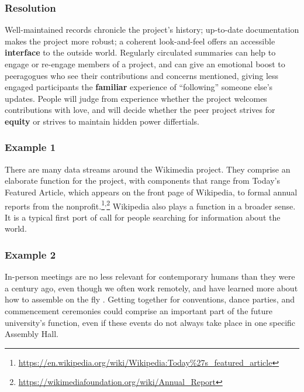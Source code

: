 \subsubsection*{Resolution} 
Well-maintained records chronicle the project's history; up-to-date documentation makes the project more robust; a coherent look-and-feel offers an accessible \textbf{interface} to the outside world.  Regularly circulated summaries can help to engage or re-engage members of a project, and can give an emotional boost to peeragogues who see their contributions and concerns mentioned, giving less engaged participants the \textbf{familiar} experience of ``following'' someone else's updates. People will judge from experience whether the project welcomes contributions with love, and will decide whether the peer project strives for \textbf{equity} or strives to maintain hidden power differtials.  

\subsubsection*{Example 1} 
There are many data streams around the Wikimedia project.  They comprise
an elaborate  function for the project, with components
that range from Today's Featured Article, which appears on the front page of
Wikipedia, to formal annual reports from the  nonprofit.\footnote{\url{https://en.wikipedia.org/wiki/Wikipedia:Today\%27s_featured_article}}\textsuperscript{,}\footnote{\url{https://wikimediafoundation.org/wiki/Annual_Report}}
Wikipedia also plays a  function in a broader sense.
It is a typical first port of call for people searching for information about the world.

\subsubsection*{Example 2} In-person meetings are no less relevant
for contemporary humans than they were a century ago, even though we
often work remotely, and have learned more about how to assemble on the fly
\cite{rheingold2007smart}.  Getting together for conventions, dance
parties, and commencement ceremonies could comprise an important part
of the future university's  function, even if
these events do not always take place in one specific Assembly Hall.

